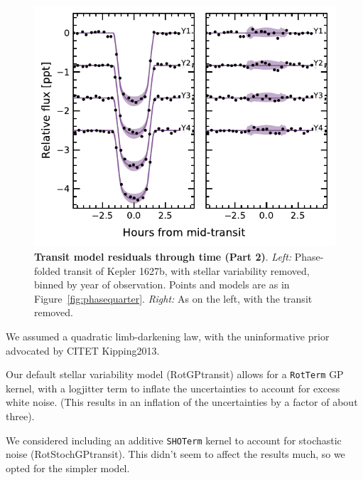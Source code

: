 \documentclass[12pt,modern,tighten]{aastex63}
\begin{document}
\begin{figure}[t]
	\begin{center}
		\leavevmode
		\includegraphics[width=1\textwidth]{f10.pdf}
	\end{center}
	\vspace{-0.7cm}
	\caption{
    {\bf Transit model residuals through time (Part 2)}.  
    {\it Left:}
		Phase-folded transit of Kepler 1627b, with stellar
    variability removed, binned by year of observation.
    Points and models are as in Figure~\ref{fig:phasequarter}.
    {\it Right:}
    As on the left, with the transit removed.
		\label{fig:phaseyear}
	}
\end{figure}



We assumed a quadratic limb-darkening law, with the uninformative prior
advocated by CITET Kipping2013.


Our default stellar variability model (RotGPtransit) allows for a
\texttt{RotTerm} GP kernel, with a logjitter term to inflate the
uncertainties to account for excess white noise.  (This results in an
inflation of the uncertainties by a factor of about three).

We considered including an additive \texttt{SHOTerm} kernel to account
for stochastic noise (RotStochGPtransit).  This didn't seem to affect
the results much, so we opted for the simpler model.
\end{document}
